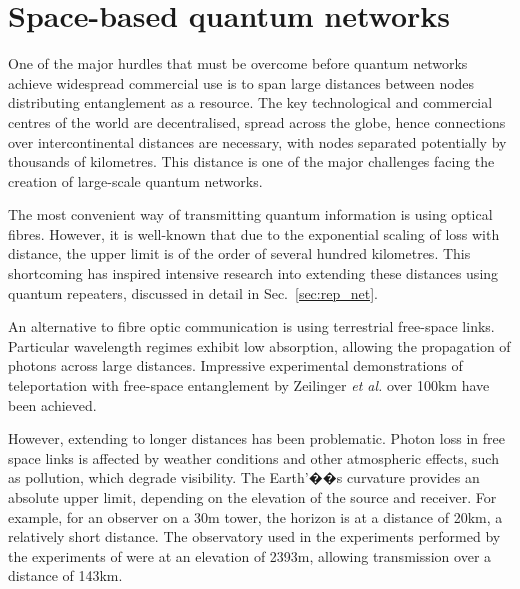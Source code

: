 %
%

\section{Space-based quantum networks}\label{sec:quant_space_race}


One of the major hurdles that must be overcome before quantum networks achieve widespread commercial use is to span large distances between nodes distributing entanglement as a resource. The key technological and commercial centres of the world are decentralised, spread across the globe, hence connections over intercontinental distances are necessary, with nodes separated potentially by thousands of kilometres. This distance is one of the major challenges facing the creation of large-scale quantum networks.

The most convenient way of transmitting quantum information is using optical fibres. However, it is well-known that due to the exponential scaling of loss with distance, the upper limit is of the order of several hundred kilometres. This shortcoming has inspired intensive research into extending these distances using quantum repeaters, discussed in detail in Sec.~\ref{sec:rep_net}.

An alternative to fibre optic communication is using terrestrial free-space links. Particular wavelength regimes exhibit low absorption, allowing the propagation of photons across large distances. Impressive experimental demonstrations of teleportation with free-space entanglement by Zeilinger \textit{et al.} \cite{bib:ursin07, bib:ma2012quantum, bib:yin2013lower} over 100km have been achieved.

However, extending to longer distances has been problematic. Photon loss in free space links is affected by weather conditions and other atmospheric effects, such as pollution, which degrade visibility. The Earth'��s curvature provides an absolute upper limit, depending on the elevation of the source and receiver. For example, for an observer on a 30m tower, the horizon is at a distance of 20km, a relatively short distance. The observatory used in the experiments performed by the experiments of \cite{bib:ursin07, bib:ma2012quantum} were at an elevation of 2393m, allowing transmission over a distance of 143km.

